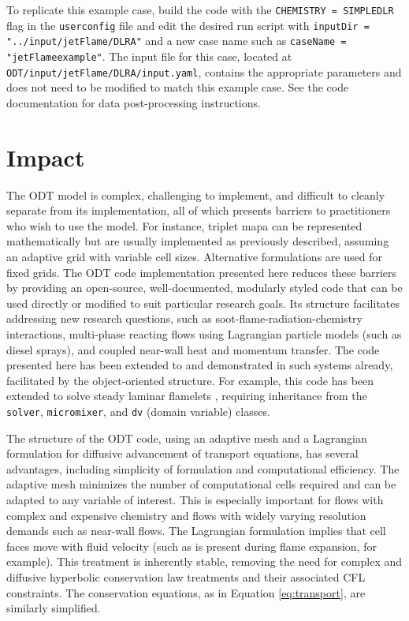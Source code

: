 \documentclass[preprint,12pt, a4paper]{elsarticle}
\begin{document}
To replicate this example case, build the code with the \texttt{CHEMISTRY = SIMPLEDLR} flag in the \texttt{user\textunderscore config} file and edit the desired run script with \texttt{inputDir = "../input/jetFlame/DLR\textunderscore A"} and a new case name such as \texttt{caseName = "jetFlame\textunderscore example"}. The input file for this case, located at \texttt{ODT/input/jetFlame/DLR\textunderscore A/input.yaml}, contains the appropriate parameters and does not need to be modified to match this example case. See the code documentation for data post-processing instructions.

\section{Impact}
\label{sec:impact}
The ODT model is complex, challenging to implement, and difficult to cleanly separate from its implementation, all of which presents barriers to practitioners who wish to use the model. For instance, triplet mapa can be represented mathematically but are usually implemented as previously described, assuming an adaptive grid with variable cell sizes. Alternative formulations are used for fixed grids. The ODT code implementation presented here reduces these barriers by providing an open-source, well-documented, modularly styled code that can be used directly or modified to suit particular research goals. Its structure facilitates addressing new research questions, such as soot-flame-radiation-chemistry interactions, multi-phase reacting flows using Lagrangian particle models (such as diesel sprays), and coupled near-wall heat and momentum transfer. The code presented here has been extended to and demonstrated in such systems already, facilitated by the object-oriented structure. For example, this code has been extended to solve steady laminar flamelets \cite{Peters_1984}, requiring inheritance from the \texttt{solver}, \texttt{micromixer}, and \texttt{dv} (domain variable) classes.

The structure of the ODT code, using an adaptive mesh and a Lagrangian formulation for diffusive advancement of transport equations, has several advantages, including simplicity of formulation and computational efficiency. The adaptive mesh minimizes the number of computational cells required and can be adapted to any variable of interest. This is especially important for flows with complex and expensive chemistry and flows with widely varying resolution demands such as near-wall flows. The Lagrangian formulation implies that cell faces move with fluid velocity (such as is present during flame expansion, for example). This treatment is inherently stable, removing the need for complex and diffusive hyperbolic conservation law treatments and their associated CFL constraints. The conservation equations, as in Equation \ref{eq:transport}, are similarly simplified.
\end{document}
